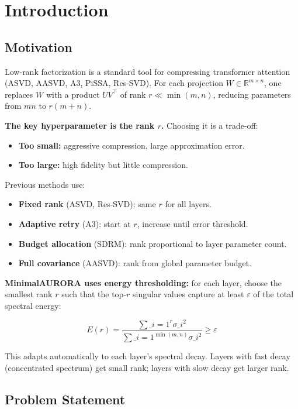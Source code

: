 \section{Introduction}

\subsection{Motivation}

Low-rank factorization is a standard tool for compressing transformer 
attention (ASVD, AASVD, A3, PiSSA, Res-SVD). For each projection 
$W \in \mathbb{R}^{m \times n}$, one replaces $W$ with a product $UV^\top$ 
of rank $r \ll \min(m, n)$, reducing parameters from $mn$ to $r(m + n)$.

\textbf{The key hyperparameter is the rank $r$.} Choosing it is a trade-off:

\begin{itemize}
\item \textbf{Too small:} aggressive compression, large approximation error.
\item \textbf{Too large:} high fidelity but little compression.

\end{itemize}
Previous methods use:

\begin{itemize}
\item \textbf{Fixed rank} (ASVD, Res-SVD): same $r$ for all layers.
\item \textbf{Adaptive retry} (A3): start at $r$, increase until error threshold.
\item \textbf{Budget allocation} (SDRM): rank proportional to layer parameter count.
\item \textbf{Full covariance} (AASVD): rank from global parameter budget.

\end{itemize}
\textbf{MinimalAURORA uses energy thresholding:} for each layer, choose the 
smallest rank $r$ such that the top-$r$ singular values capture at least 
$\varepsilon$ of the total spectral energy:

\[
E(r) = \frac{\sum\_{i=1}^r \sigma\_i^2}{\sum\_{i=1}^{\min(m,n)} \sigma\_i^2} \geq \varepsilon
\tag{1.1}
\]

This adapts automatically to each layer's spectral decay. Layers with 
fast decay (concentrated spectrum) get small rank; layers with slow decay 
get larger rank.

\subsection{Problem Statement}


